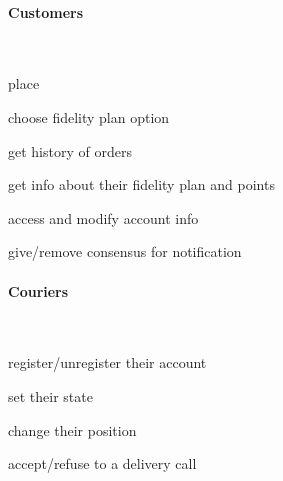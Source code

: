 \paragraph*{Customers}~\vspace{0.3\baselineskip}
\begin{itemize}
  \begin{minipage}{0.47\linewidth}
    \item place \Order
    \item choose fidelity plan option
    \item get history of orders
  \end{minipage}
  \begin{minipage}{0.53\linewidth}
    \item get info about their fidelity plan and points
    \item access and modify account info
    \item give/remove consensus for notification
  \end{minipage}
\end{itemize}

\paragraph*{Couriers}~\vspace{0.3\baselineskip}
\begin{itemize}
  \begin{minipage}{0.47\linewidth}
    \item register/unregister their account
    \item set their state
  \end{minipage}
  \begin{minipage}{0.53\linewidth}
    \item change their position
    \item accept/refuse to a delivery call
  \end{minipage}
\end{itemize}


